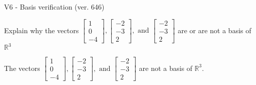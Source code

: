 \begin{exercise}
  \begin{exerciseTitle}V6 - Basis verification (ver. 646)\end{exerciseTitle}
  \begin{exerciseStatement}
    Explain why the vectors \(\left[\begin{array}{r}
1 \\
0 \\
-4
\end{array}\right] , \left[\begin{array}{r}
-2 \\
-3 \\
2
\end{array}\right] , \text{ and } \left[\begin{array}{r}
-2 \\
-3 \\
2
\end{array}\right]\) are or are not a basis of \(\mathbb{R}^3\)	


  \end{exerciseStatement}
  \begin{exerciseAnswer}
   The vectors \(\left[\begin{array}{r}
1 \\
0 \\
-4
\end{array}\right] , \left[\begin{array}{r}
-2 \\
-3 \\
2
\end{array}\right] , \text{ and } \left[\begin{array}{r}
-2 \\
-3 \\
2
\end{array}\right]\) 
  	 are not  a basis of \(\mathbb{R}^3\).
  


  \end{exerciseAnswer}
\end{exercise}